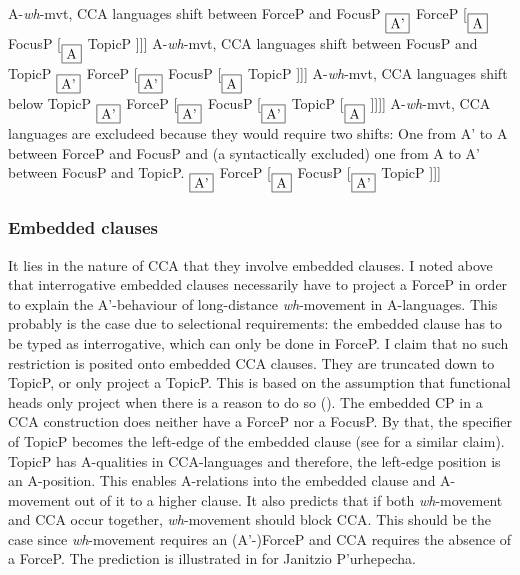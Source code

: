 \documentclass[output=paper,colorlinks,citecolor=brown]{langscibook}
\begin{document}
\ea\label{lohningerderivation1}
\ea \cmark A-\textit{wh}-mvt, \cmark CCA languages shift between ForceP and FocusP
\ex {[}$_{\fbox{A'}}$ ForceP \rightarrow [$_{\fbox{A}}$  FocusP [$_{\fbox{A}}$  TopicP {]]]}
\z\z 
\ea
\ea \xmark A-\textit{wh}-mvt, \cmark CCA languages shift between FocusP and TopicP
\ex {[}$_{\fbox{A'}}$ ForceP  [$_{\fbox{A'}}$  FocusP \rightarrow [$_{\fbox{A}}$  TopicP {]]]}
\z\z 
\ea
\ea \xmark A-\textit{wh}-mvt, \xmark CCA languages shift below TopicP
\ex {[}$_{\fbox{A'}}$ ForceP [$_{\fbox{A'}}$  FocusP [$_{\fbox{A'}}$  TopicP  \rightarrow [$_{\fbox{A}}$ {]]]]}
\z\z 
\ea
\ea \cmark A-\textit{wh}-mvt, \xmark CCA languages are excludeed because they would require two shifts: One from A' to A between ForceP and FocusP and (a syntactically excluded) one from A to A' between FocusP and TopicP.
\ex * {[}$_{\fbox{A'}}$ ForceP \rightarrow [$_{\fbox{A}}$  FocusP \rightarrow [$_{\fbox{A'}}$  TopicP {]]]}
\z\z 

\subsubsection{Embedded clauses}\label{sec:lohninger:4.4.3}
It lies in the nature of CCA that they involve embedded clauses. I noted above that interrogative embedded clauses necessarily have to project a ForceP in order to explain the A'-behaviour of long-distance \textit{wh}-movement in A-languages. This probably is the case due to selectional requirements: the embedded clause has to be typed as interrogative, which can only be done in ForceP. I claim that no such restriction is posited onto embedded CCA clauses. They are truncated down to TopicP, or only project a TopicP. This is based on the assumption that functional heads only project when there is a reason to do so (\citealp{bovskovic1997syntax}). The embedded CP in a CCA construction does neither have a ForceP nor a FocusP. By that, the specifier of TopicP becomes the left-edge of the embedded clause (see \citealp{csener2008non} for a similar claim). TopicP has A-qualities in CCA-languages and therefore, the left-edge position is an A-position. This enables A-relations into the embedded clause and A-movement out of it to a higher clause. It also predicts that if both \textit{wh}-movement and CCA occur together, \textit{wh}-movement should block CCA. This should be the case since \textit{wh}-movement requires an \mbox{(A'-)ForceP} and CCA requires the absence of a ForceP. The prediction is illustrated in \citet{zyman2018rich} for Janitzio P’urhepecha. 
\end{document}
